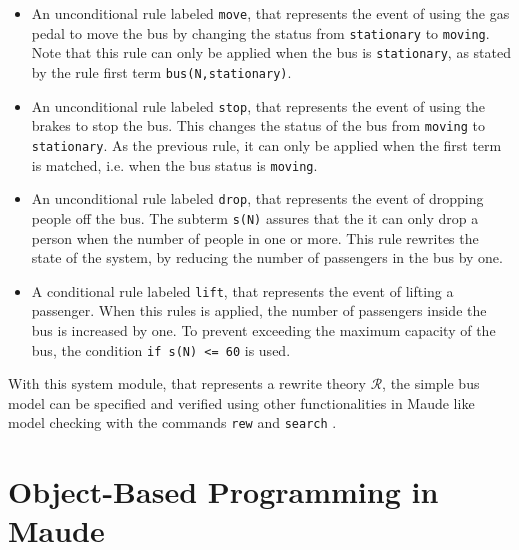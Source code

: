 \begin{itemize}
    \item An unconditional rule labeled \texttt{move}, that represents the event of using the gas pedal to move the bus by changing the status from \texttt{stationary} to \texttt{moving}. Note that this rule can only be applied when the bus is \texttt{stationary}, as stated by the rule first term \texttt{bus(N,stationary)}.
    \item An unconditional rule labeled \texttt{stop}, that represents the event of using the brakes to stop the bus. This changes the status of the bus from \texttt{moving} to \texttt{stationary}. As the previous rule, it can only be applied when the first term is matched, i.e. when the bus status is \texttt{moving}. 
    \item An unconditional rule labeled \texttt{drop}, that represents the event of dropping people off the bus. The subterm \texttt{s(N)} assures that the it can only drop a person when the number of people in one or more. This rule rewrites the state of the system, by reducing the number of passengers in the bus by one.
    \item A conditional rule labeled \texttt{lift}, that represents the event of lifting a passenger. When this rules is applied, the number of passengers inside the bus is increased by one. To prevent exceeding the maximum capacity of the bus, the condition \texttt{if s(N) <= 60} is used. 
\end{itemize}
With this system module, that represents a rewrite theory $\mathscr{R}$, the simple bus model can be specified and verified using other functionalities in Maude like model checking with the commands \texttt{rew} and \texttt{search} \cite{MaudeManual}.


\section{Object-Based Programming in Maude}



